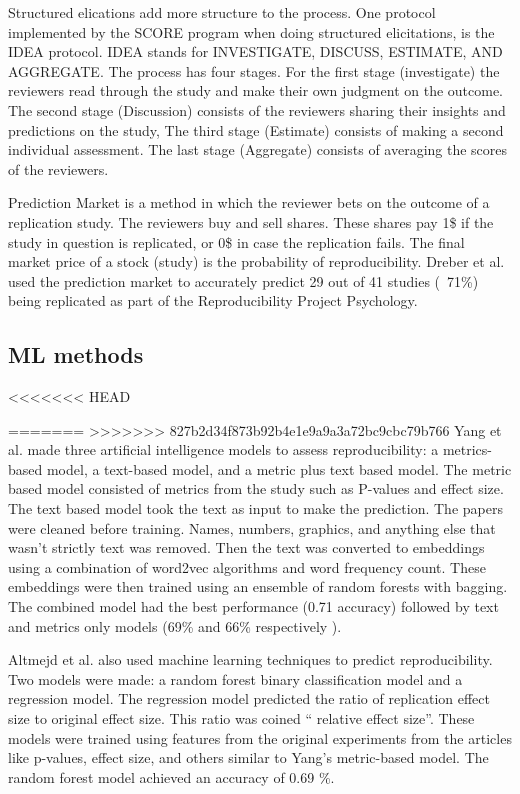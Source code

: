 \documentclass[
10pt, %
a4paper, %
oneside, %
headinclude,footinclude, %
BCOR5mm, %
]{scrartcl}
\begin{document}
Structured elications add more structure to the process. One protocol implemented by the SCORE program when doing structured elicitations, is the IDEA protocol. IDEA stands for INVESTIGATE, DISCUSS, ESTIMATE, AND AGGREGATE. The process has four stages. For the first stage (investigate) the reviewers read through the study and make their own judgment on the outcome. The second stage (Discussion) consists of the reviewers sharing their insights and predictions on the study, The third stage (Estimate) consists of making a second individual assessment. The last stage (Aggregate) consists of averaging the scores of the reviewers. 

Prediction Market is a method in which the reviewer bets on the outcome of a replication study. The reviewers buy and sell shares. These shares pay 1\$ if the study in question is replicated, or 0\$ in case the replication fails. The final market price of a stock (study) is the probability of reproducibility. Dreber et al. used the prediction market to accurately predict 29 out of 41 studies (~71\%) being replicated as part of the Reproducibility Project Psychology. 


\subsection{ML methods}
<<<<<<< HEAD


=======
>>>>>>> 827b2d34f873b92b4e1e9a9a3a72bc9cbc79b766
Yang et al. made three artificial intelligence models to assess reproducibility: a metrics-based model, a text-based model, and a metric plus text based model. The metric based model consisted of metrics from the study such as P-values and effect size. The text based model took the text as input to make the prediction. The papers were cleaned before training. Names, numbers, graphics, and anything else that wasn’t strictly text was removed. Then the text was converted to embeddings using a combination of word2vec algorithms and word frequency count. These embeddings were then trained using an ensemble of random forests with bagging.  The combined model had the best performance (0.71 accuracy) followed by text and metrics only models (69\% and 66\% respectively ). 


Altmejd et al. also used machine learning techniques to predict reproducibility. Two models were made: a random forest binary classification model and a regression model. The regression model predicted the ratio of replication effect size to original effect size. This ratio was coined “ relative effect size”. These models were trained using features from the original experiments from the articles like p-values, effect size, and others similar to Yang's metric-based model. The random forest model achieved an accuracy of 0.69 \%. 
\end{document}
